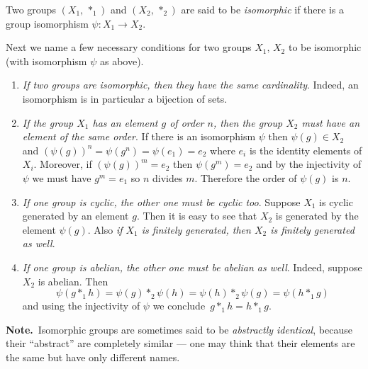 \documentclass[12pt]{article}
\begin{document}
Two groups $(X_1,\,*_1)$ and $(X_2,\,*_2)$ are said to be {\em isomorphic} if there is a group isomorphism $\psi\colon X_1\to X_2$.

Next we name a few necessary conditions for two groups $X_1,\,X_2$ to be isomorphic (with isomorphism $\psi$ as above). 

\begin{enumerate}
\item {\it If two groups are isomorphic, then they have the same cardinality}. Indeed, an isomorphism is in particular a bijection of sets.

\item {\it If the group $X_1$ has an element $g$ of order $n$, then the group $X_2$ must have an element of the same order}. If there is an isomorphism $\psi$ then $\psi(g)\in X_2$ and $(\psi(g))^n=\psi(g^n)=\psi(e_1)=e_2$ where $e_i$ is the identity elements of $X_i$. Moreover, if $(\psi(g))^m=e_2$ then $\psi(g^m)=e_2$ and by the injectivity of $\psi$ we must have $g^m=e_1$ so $n$ divides $m$. Therefore the order of $\psi(g)$ is $n$.

\item {\it If one group is cyclic, the other one must be cyclic too}. Suppose $X_1$ is cyclic generated by an element $g$. Then it is easy to see that $X_2$ is generated by the element $\psi(g)$. Also {\it if $X_1$ is finitely generated, then $X_2$ is finitely generated as well}.

\item {\it If one group is abelian, the other one must be abelian as well}. Indeed, suppose $X_2$ is abelian. Then 
$$\psi(g*_1 h)=\psi(g)*_2 \psi(h)=\psi(h)*_2 \psi(g) =\psi(h*_1 g)$$
and using the injectivity of $\psi$ we conclude \,$g*_1 h=h*_1 g$. 
\end{enumerate}

\textbf{Note.}\, Isomorphic groups are sometimes said to be {\em abstractly identical}, because their ``abstract''  are completely similar --- one may think that their elements are the same but have only different names.
\end{document}
